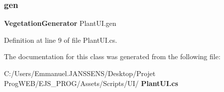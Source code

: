 \subsubsection{gen}
{\footnotesize\ttfamily \textbf{ Vegetation\+Generator} Plant\+U\+I.\+gen}



Definition at line 9 of file Plant\+U\+I.\+cs.



The documentation for this class was generated from the following file\+:\begin{DoxyCompactItemize}
\item 
C\+:/\+Users/\+Emmanuel.\+J\+A\+N\+S\+S\+E\+N\+S/\+Desktop/\+Projet Prog\+W\+E\+B/\+E\+J\+S\+\_\+\+P\+R\+O\+G/\+Assets/\+Scripts/\+U\+I/\textbf{ Plant\+U\+I.\+cs}\end{DoxyCompactItemize}
